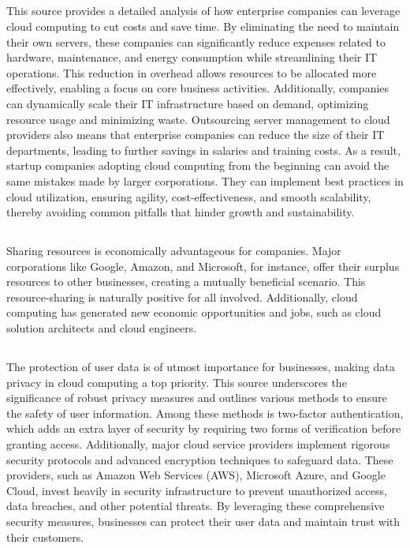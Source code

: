 \documentclass[12pt,letterpaper]{article}
\begin{document}
\subsection*{}
This source provides a detailed analysis of how enterprise companies can leverage cloud computing to cut costs and save time. By eliminating the need to maintain their own servers, these companies can significantly reduce expenses related to hardware, maintenance, and energy consumption while streamlining their IT operations. This reduction in overhead allows resources to be allocated more effectively, enabling a focus on core business activities. Additionally, companies can dynamically scale their IT infrastructure based on demand, optimizing resource usage and minimizing waste. Outsourcing server management to cloud providers also means that enterprise companies can reduce the size of their IT departments, leading to further savings in salaries and training costs. As a result, startup companies adopting cloud computing from the beginning can avoid the same mistakes made by larger corporations. They can implement best practices in cloud utilization, ensuring agility, cost-effectiveness, and smooth scalability, thereby avoiding common pitfalls that hinder growth and sustainability.

\subsection*{}
Sharing resources is economically advantageous for companies. Major corporations like Google, Amazon, and Microsoft, for instance, offer their surplus resources to other businesses, creating a mutually beneficial scenario. This resource-sharing is naturally positive for all involved. Additionally, cloud computing has generated new economic opportunities and jobs, such as cloud solution architects and cloud engineers.

\subsection*{}
The protection of user data is of utmost importance for businesses, making data privacy in cloud computing a top priority. This source underscores the significance of robust privacy measures and outlines various methods to ensure the safety of user information. Among these methods is two-factor authentication, which adds an extra layer of security by requiring two forms of verification before granting access. Additionally, major cloud service providers implement rigorous security protocols and advanced encryption techniques to safeguard data. These providers, such as Amazon Web Services (AWS), Microsoft Azure, and Google Cloud, invest heavily in security infrastructure to prevent unauthorized access, data breaches, and other potential threats. By leveraging these comprehensive security measures, businesses can protect their user data and maintain trust with their customers.
\end{document}
